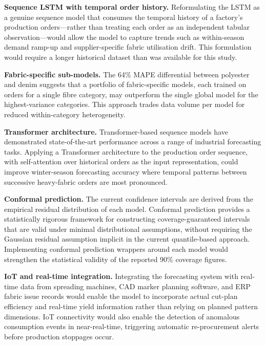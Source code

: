 \textbf{Sequence LSTM with temporal order history.} Reformulating the LSTM as a genuine sequence model that consumes the temporal history of a factory's production orders---rather than treating each order as an independent tabular observation---would allow the model to capture trends such as within-season demand ramp-up and supplier-specific fabric utilisation drift. This formulation would require a longer historical dataset than was available for this study.

\textbf{Fabric-specific sub-models.} The 64\% MAPE differential between polyester and denim suggests that a portfolio of fabric-specific models, each trained on orders for a single fibre category, may outperform the single global model for the highest-variance categories. This approach trades data volume per model for reduced within-category heterogeneity.

\textbf{Transformer architecture.} Transformer-based sequence models have demonstrated state-of-the-art performance across a range of industrial forecasting tasks. Applying a Transformer architecture to the production order sequence, with self-attention over historical orders as the input representation, could improve winter-season forecasting accuracy where temporal patterns between successive heavy-fabric orders are most pronounced.

\textbf{Conformal prediction.} The current confidence intervals are derived from the empirical residual distribution of each model. Conformal prediction provides a statistically rigorous framework for constructing coverage-guaranteed intervals that are valid under minimal distributional assumptions, without requiring the Gaussian residual assumption implicit in the current quantile-based approach. Implementing conformal prediction wrappers around each model would strengthen the statistical validity of the reported 90\% coverage figures.

\textbf{IoT and real-time integration.} Integrating the forecasting system with real-time data from spreading machines, CAD marker planning software, and ERP fabric issue records would enable the model to incorporate actual cut-plan efficiency and real-time yield information rather than relying on planned pattern dimensions. IoT connectivity would also enable the detection of anomalous consumption events in near-real-time, triggering automatic re-procurement alerts before production stoppages occur.

\secdiv
